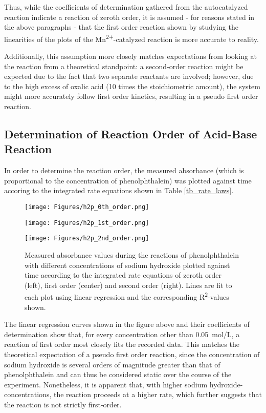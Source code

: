 \documentclass[titlepage]{article}
\begin{document}
Thus, while the coefficients of determination gathered from the autocatalyzed reaction indicate a reaction of zeroth order, it is assumed - for reasons stated in the above paragraphs - that the first order reaction shown by studying the linearities of the plots of the Mn\textsuperscript{2+}-catalyzed reaction is more accurate to reality.

Additionally, this assumption more closely matches expectations from looking at the reaction from a theoretical standpoint: a second-order reaction might be expected due to the fact that two separate reactants are involved; however, due to the high excess of oxalic acid (10 times the stoichiometric amount), the system might more accurately follow first order kinetics, resulting in a pseudo first order reaction.

\newpage
\subsection{Determination of Reaction Order of Acid-Base Reaction}
In order to determine the reaction order, the measured absorbance (which is proportional to the concentration of phenolphthalein) was plotted against time accoring to the integrated rate equations shown in Table \ref{tb_rate_laws}.

\begin{figure}[H]
    \centering
    \begin{minipage}[c]{0.32\textwidth}
        \texttt{[image: Figures/h2p\_0th\_order.png]}
    \end{minipage}
    \begin{minipage}[c]{0.32\textwidth}
        \texttt{[image: Figures/h2p\_1st\_order.png]}
    \end{minipage}
    \begin{minipage}[c]{0.32\textwidth}
        \texttt{[image: Figures/h2p\_2nd\_order.png]}
    \end{minipage}
    \caption{Measured absorbance values during the reactions of phenolphthalein with different concentrations of sodium hydroxide plotted against time according to the integrated rate equations of zeroth order (left), first order (center) and second order (right). Lines are fit to each plot using linear regression and the corresponding R\textsuperscript{2}-values shown.}
    \label{fig_h2p_rates}
\end{figure}
%
\noindent The linear regression curves shown in the figure above and their coefficients of determination show that, for every concentration other than 0.05~mol/L, a reaction of first order most closely fits the recorded data. This matches the theoretical expectation of a pseudo first order reaction, since the concentration of sodium hydroxide is several orders of magnitude greater than that of phenolphthalein and can thus be considered static over the course of the experiment. Nonetheless, it is apparent that, with higher sodium hydroxide-concentrations, the reaction proceeds at a higher rate, which further suggests that the reaction is not strictly first-order.
\end{document}
